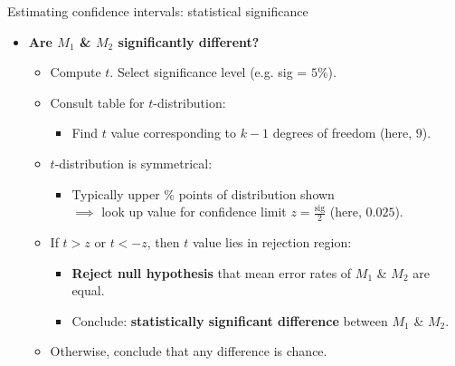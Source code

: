 \documentclass[aspectratio=169,t,table]{beamer}
\begin{document}
  {
    \begin{frame}{Estimating confidence intervals: statistical significance}
      \begin{itemize}
        \item \textbf{Are $M_1$ \& $M_2$ {\color{airforceblue} significantly different}?}
        \begin{itemize}
          \item Compute $t$. Select significance level (e.g. sig = $5\%$).
          \item Consult table for $t$-distribution:
          \begin{itemize}
            \item Find $t$ value corresponding to $k-1$ degrees of freedom (here, $9$).
          \end{itemize}
          \item $t$-distribution is symmetrical:
          \begin{itemize}
            \item Typically upper $\%$ points of distribution shown \\
                  $\implies$ look up value for confidence limit $z = \frac{\text{sig}}{2}$ (here, $0.025$).
          \end{itemize}
          \item If $t > z$ or $t < -z$, then $t$ value lies in rejection region:
                \begin{itemize}
                  \item \textbf{Reject null hypothesis} that mean error rates of $M_1$ \& $M_2$ are equal.
                  \item Conclude: \textbf{statistically significant difference} between $M_1$ \& $M_2$.
                \end{itemize}
          \item Otherwise, conclude that any difference is chance.
        \end{itemize}
      \end{itemize}
    \end{frame}
  }
\end{document}
